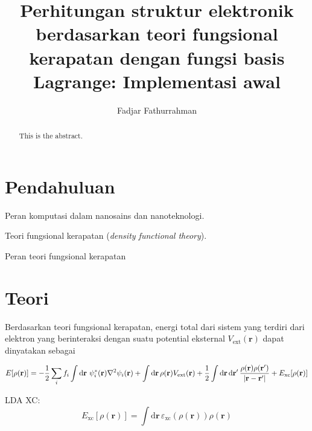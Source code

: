 \documentclass[%
reprint,
amsmath,
amssymb,
aps,
]{revtex4-1}
\begin{document}
\title{Perhitungan struktur elektronik berdasarkan teori fungsional
    kerapatan dengan fungsi basis Lagrange: Implementasi awal}
\author{Fadjar Fathurrahman}

\begin{abstract}
This is the abstract.
\end{abstract}

\maketitle

\section{Pendahuluan}

Peran komputasi dalam nanosains dan nanoteknologi.

Teori fungsional kerapatan (\emph{density functional theory}).

Peran teori fungsional kerapatan

\section{Teori}

Berdasarkan teori fungsional kerapatan,
energi total dari sistem yang terdiri dari elektron yang berinteraksi
dengan suatu potential eksternal $V_{\mathrm{ext}}(\mathbf{r})$
dapat dinyatakan sebagai
\begin{widetext}
\begin{equation}
E[\rho(\mathbf{r})] = 
-\frac{1}{2}\sum_{i}f_{i}
\int\mathrm{d}\mathbf{r}\,
\, \psi^{*}_{i}(\mathbf{r}) \nabla^2 \psi_{i}(\mathbf{r})
\\
+ \int\mathrm{d}\mathbf{r}\,
\rho(\mathbf{r}) V_{\mathrm{ext}}(\mathbf{r})
+
\frac{1}{2}\int\mathrm{d}\mathbf{r}\,\mathrm{d}\mathbf{r}'\,
\frac{\rho(\mathbf{r})\rho(\mathbf{r}')}{\left|\mathbf{r}-\mathbf{r}'\right|}
\\
+ E_{\mathrm{xc}}[\rho(\mathbf{r})]
\end{equation}
\end{widetext}

LDA XC:
\begin{equation}
E_{\mathrm{xc}}[\rho(\mathbf{r})] =
\int\mathrm{d}\mathbf{r}\,
\varepsilon_{\mathrm{xc}}(\rho(\mathbf{r}))
\rho(\mathbf{r})
\end{equation}
\end{document}
